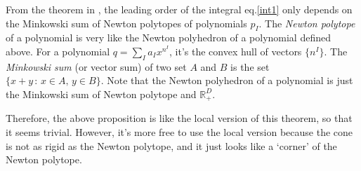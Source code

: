 \documentclass[12pt]{article}
\theoremstyle{definition}
\theoremstyle{plain}
\newtheorem{lem}[para]{Lemma}
\begin{document}
From the theorem in \cite{Arkani-Hamed:2019mrd}, the leading order of the integral eq.\eqref{int1} 
only depends on the Minkowski sum of Newton polytopes of polynomials $p_I$.
The \textit{Newton polytope} of a polynomial is very like the Newton polyhedron of a polynomial defined above.
For a polynomial $q=\sum_I a_I x^{n^I}$, it's the convex hull of vectors $\{n^I\}$. The
\textit{Minkowski sum} (or vector sum) of two set $A$ and $B$ is the set $\{x+y\,:\,x\in A,\,y\in B\}$. 
Note that the Newton polyhedron of a polynomial is just the Minkowski sum of Newton polytope and $\mathbb R_+^D$.

Therefore, the above proposition is like the local version of this theorem, so that 
it seems trivial. However, it's more free to use the local version because 
the cone is not as rigid as the Newton polytope, and it just looks  
like a `corner' of the Newton polytope.


\end{document}
